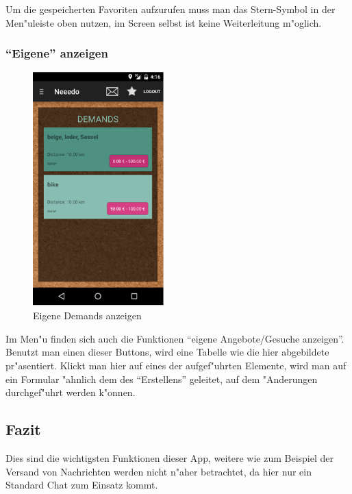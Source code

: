 Um die gespeicherten Favoriten aufzurufen muss man das Stern-Symbol in der Men"uleiste oben nutzen, im Screen selbst ist keine Weiterleitung m"oglich. 

\subsubsection{\enquote{Eigene} anzeigen}

\begin{figure}[H]
\begin{center}
\includegraphics[width=0.45\textwidth]{./Bilder/liste.png}
\caption{Eigene Demands anzeigen}
\label{fig:anzeigen}
\end{center}
\end{figure}

Im Men"u finden sich auch die Funktionen \enquote{eigene Angebote/Gesuche anzeigen}. 
Benutzt man einen dieser Buttons, wird eine Tabelle wie die hier abgebildete pr"asentiert.
Klickt man hier auf eines der aufgef"uhrten Elemente, wird man auf ein Formular "ahnlich dem des \enquote{Erstellens} geleitet, auf dem "Anderungen durchgef"uhrt werden k"onnen. 

\subsection{Fazit}

Dies sind die wichtigsten Funktionen dieser App, weitere wie zum Beispiel der Versand von Nachrichten werden nicht n"aher betrachtet, da hier nur ein Standard Chat zum Einsatz kommt. 

